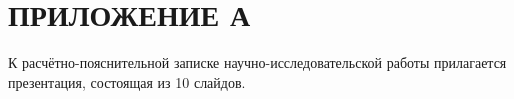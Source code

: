 \renewcommand{\thefigure}{\Asbuk{chapter}.\arabic{figure}} %
\addtocounter{chapter}{-1}

\chapter*{\centering ПРИЛОЖЕНИЕ А}
К расчётно-пояснительной записке научно-исследовательской работы прилагается презентация, состоящая из 10 слайдов.
\clearpage
%
%
%
%
%
%
%
%
